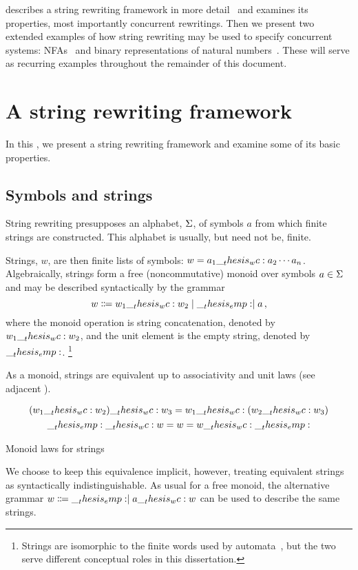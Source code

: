  describes a string rewriting framework in more detail~ and examines its properties, most importantly concurrent rewritings.
Then we present two extended examples of how string rewriting may be used to specify concurrent systems: \aclp*{NFA}~ and binary representations of natural numbers~.
These will serve as recurring examples throughout the remainder of this document.

\section{A string rewriting framework}\label{sec:string-rewriting:framework}

In this , we present a string rewriting framework and examine some of its basic properties.

\subsection{Symbols and strings}

String rewriting presupposes an alphabet, $\Sigma$, of symbols $a$ from which finite strings are constructed.
This alphabet is usually, but need not be, finite.

Strings, $w$, are then finite lists of symbols: $w = a_1 \wc a_2 \dotsb a_n$.
Algebraically, strings form a free (noncommutative) monoid over symbols $a \in \Sigma$ and may be described syntactically by the grammar
\begin{equation*}
  w \Coloneqq w_1 \wc w_2 \mid \emp \mid a
  \,,
\end{equation*}
where the monoid operation is string concatenation, denoted by $w_1 \wc w_2$, and the unit element is the empty string, denoted by $\__thesis_emp:$.%
\footnote{Strings are isomorphic to the finite words used by automata~, but the two serve different conceptual roles in this dissertation.}

As a monoid, strings are equivalent up to associativity and unit laws (see adjacent ).%
\begin{marginfigure}
  \begin{gather*}
    (w_1 \wc w_2) \wc w_3 = w_1 \wc (w_2 \wc w_3) \\
    \emp \wc w = w = w \wc \emp
  \end{gather*}
  \caption{Monoid laws for strings}\label{fig:string-rewriting:monoid-laws}
\end{marginfigure}
We choose to keep this equivalence implicit, however, treating equivalent strings as syntactically indistinguishable.
As usual for a free monoid, the alternative grammar
    $w \Coloneqq \emp \mid a \wc w$
can be used to   describe the same strings.


